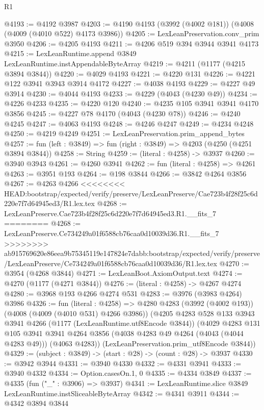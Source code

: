 \begin{lexlean}{R1}
\begin{coremodule}
{{{{{{{{{{{{{{{{{{{{{{{{{{{{{{{{{{{{{{{{{{{{{{{{{{{{{{{{{{{{{{{{{{{{{{{{{{{{{{{{{{{{{{{{{{{{{{{{{{{{{{{{{{{{{{{{{{{{{{{{{{{{{{{{{{{{{{{{{{{{{{{{{{{{{{{{{{{{{{{{{{{{{{{{{{{{{{{{{{{{{{{{{{@4193 := @4192 @3987
@4203 := @4190 @4193 (@3992 (@4002 @181)) (@4008 (@4009 (@4010 @522) @4173 @3986))
@4205 := LexLeanPreservation.conv_prim @3950
@4206 := @4205 @4193
@4211 := @4206 @519 @394 @3944 @3941 @4173
@4215 := LexLeanRuntime.append @3849 LexLeanRuntime.instAppendableByteArray
@4219 := @4211 (@1177 (@4215 @3894 @3844))
@4220 := @4029 @4193
@4221 := @4220 @131
@4226 := @4221 @122 @3941 @3943 @3914 @4172
@4227 := @4038 @4193
@4229 := @4227 @49 @3914
@4230 := @4044 @4193
@4233 := @4229 (@4043 (@4230 @49))
@4234 := @4226 @4233
@4235 := @4220 @120
@4240 := @4235 @105 @3941 @3941 @4170 @3856
@4245 := @4227 @78 @4170 (@4043 (@4230 @78))
@4246 := @4240 @4245
@4247 := @4063 @4193
@4248 := @4246 @4247
@4249 := @4234 @4248
@4250 := @4219 @4249
@4251 := LexLeanPreservation.prim_append_bytes
@4257 := fun (left : @3849) => fun (right : @3849) => @4203 (@4250 (@4251 @3894 @3844))
@4258 := String
@4259 := (literal : @4258) -> @3937
@4260 := @3940 @3943
@4261 := @4260 @3941
@4262 := fun (literal : @4258) => @4261
@4263 := @3951 @193
@4264 := @198 @3844
@4266 := @3842 @4264 @3856
@4267 := @4263 @4266
<<<<<<<< HEAD:bootstrap/expected/verify/preserve/LexLeanPreserve/Cae723b4f28f25c6d220e7f7d64945ed3/R1.lex.tex
@4268 := LexLeanPreserve.Cae723b4f28f25c6d220e7f7d64945ed3.R1.__fits_7
========
@4268 := LexLeanPreserve.Ce734249a01f6588cb76caa0d10039d36.R1.__fits_7
>>>>>>>> ab915769620e86eea9b75345119e147824e7dabb:bootstrap/expected/verify/preserve/LexLeanPreserve/Ce734249a01f6588cb76caa0d10039d36/R1.lex.tex
@4270 := @3954 (@4268 @3844)
@4271 := LexLeanBoot.AxiomOutput.text
@4274 := @4270 (@1177 (@4271 @3844))
@4276 := (literal : @4258) -> @4267 @4274
@4280 := @3968 @193 @4266 @4274 @531
@4283 := @3976 (@3983 @4264) @3986
@4326 := fun (literal : @4258) =>
  @4280
    @4283
    (@3992 (@4002 @193))
    (@4008 (@4009 (@4010 @531) @4266 @3986))
    (@4205
      @4283
      @528
      @133
      @3943
      @3941
      @4266
      (@1177 (LexLeanRuntime.utf8Encode @3844))
      (@4029
        @4283
        @131
        @105
        @3941
        @3941
        @4264
        @3856
        (@4038 @4283 @49 @4264 (@4043 (@4044 @4283 @49)))
        (@4063 @4283))
      (LexLeanPreservation.prim_utf8Encode @3844))
@4329 := (subject : @3849) -> (start : @28) -> (count : @28) -> @3937
@4330 := @3942 @3944
@4331 := @3940 @4330
@4332 := @4331 @3941
@4333 := @3940 @4332
@4334 := Option.casesOn.{1, 0}
@4335 := @4334 @3849
@4337 := @4335 (fun ("_" : @3906) => @3937)
@4341 := LexLeanRuntime.slice @3849 LexLeanRuntime.instSliceableByteArray
@4342 := @4341 @3911
@4344 := @4342 @3894 @3844
}}}}}}}}}}}}}}}}}}}}}}}}}}}}}}}}}}}}}}}}}}}}}}}}}}}}}}}}}}}}}}}}}}}}}}}}}}}}}}}}}}}}}}}}}}}}}}}}}}}}}}}}}}}}}}}}}}}}}}}}}}}}}}}}}}}}}}}}}}}}}}}}}}}}}}}}}}}}}}}}}}}}}}}}}}}}}}}}}}}}}}}}}}
\end{coremodule}
\end{lexlean}
